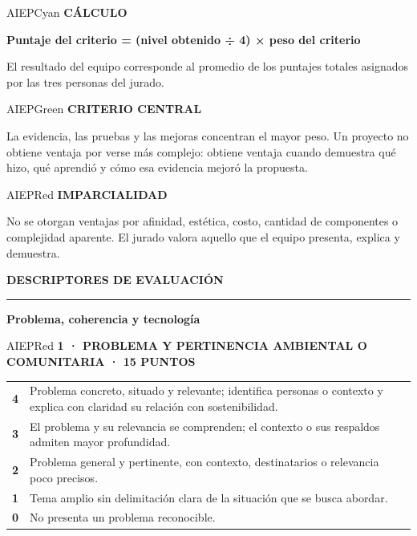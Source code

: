 \documentclass[10pt,a4paper]{article}
\newcommand{\kicker}[1]{%
  {\color{AIEPRed}\scriptsize\bfseries\MakeUppercase{#1}}\par\vspace{2.4mm}
  {\color{AIEPRed}\rule{13mm}{1.2pt}}\vspace{3mm}
}
\newcommand{\labeltext}[1]{%
  {\scriptsize\bfseries\color{AIEPSlate}\MakeUppercase{#1}}\par\vspace{1.2mm}
}
\begin{document}
\begin{softcard}{AIEPCyan}
\labeltext{Cálculo}
\centering
{\large\bfseries\color{AIEPNavy}
Puntaje del criterio = (nivel obtenido ÷ 4) × peso del criterio}
\par\vspace{2mm}
El resultado del equipo corresponde al promedio de los puntajes totales asignados por las tres
personas del jurado.
\end{softcard}

\begin{softcard}{AIEPGreen}
\labeltext{Criterio central}
La evidencia, las pruebas y las mejoras concentran el mayor peso. Un proyecto no obtiene ventaja
por verse más complejo: obtiene ventaja cuando demuestra qué hizo, qué aprendió y cómo esa
evidencia mejoró la propuesta.
\end{softcard}

\begin{softcard}{AIEPRed}
\labeltext{Imparcialidad}
No se otorgan ventajas por afinidad, estética, costo, cantidad de componentes o complejidad
aparente. El jurado valora aquello que el equipo presenta, explica y demuestra.
\end{softcard}

\newpage
\kicker{Descriptores de evaluación}
{\LARGE\bfseries\color{AIEPNavy} Problema, coherencia y tecnología}\par
\vspace{4mm}

\begin{softcard}{AIEPRed}
\labeltext{1 · Problema y pertinencia ambiental o comunitaria · 15 puntos}
\begin{tabularx}{\textwidth}{@{}C{11mm}Y@{}}
\textbf{4} & Problema concreto, situado y relevante; identifica personas o contexto y explica con claridad su relación con sostenibilidad.\\
\textbf{3} & El problema y su relevancia se comprenden; el contexto o sus respaldos admiten mayor profundidad.\\
\textbf{2} & Problema general y pertinente, con contexto, destinatarios o relevancia poco precisos.\\
\textbf{1} & Tema amplio sin delimitación clara de la situación que se busca abordar.\\
\textbf{0} & No presenta un problema reconocible.\\
\end{tabularx}
\end{softcard}
\end{document}
